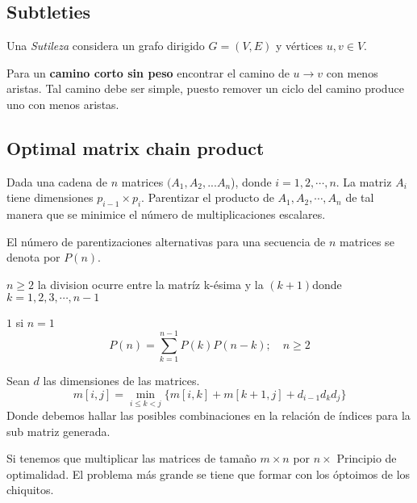 \documentclass[tikz,11pt,fleqn]{book} %
\begin{document}
\subsection{Subtleties}
Una \textit{Sutileza} considera un grafo dirigido $G=(V,E)$ y vértices $u,v\in V$.

Para un \textbf{camino corto sin peso} encontrar el camino de $u\to
 v$ con menos aristas. Tal camino debe ser simple, puesto remover un ciclo del camino produce uno con menos aristas.



\subsection{Optimal matrix chain product}
Dada una cadena de $n$ matrices $(A_1,A_2,...A_n$), donde $i=1,2,\cdots,n$. La matriz $A_i$ tiene dimensiones $p_{i-1}\times p_i$. Parentizar el producto de $A_1,A_2,\cdots,A_n$ de tal manera que se minimice el número de multiplicaciones escalares.
\begin{fact}
    El número de parentizaciones alternativas para una secuencia de $n$ matrices se denota por $P(n)$.
\end{fact}
\begin{fact}
    $n\ge 2$ la division ocurre entre la matríz k-ésima y la $(k+1) $donde $k=1,2,3,\cdots,n-1$
\end{fact}
\begin{fact}
    $1$ si $n=1$
    $$ P(n)= \sum_{k=1}^{n-1} P(k) P(n-k);\quad n\ge2
    $$
\end{fact}

\begin{theorem}
    Sean $d$ las dimensiones de las matrices.
    $$ m[i,j]=\min_{i\le k<j}\{m[i,k]+m[k+1,j]+d_{i-1}d_kd_j \} $$
    Donde debemos hallar las posibles combinaciones en la relación de índices para la sub matriz generada.
\end{theorem}

\begin{example}
    Si tenemos que multiplicar las matrices de tamaño $m\times n$ por $n\times$
    Principio de optimalidad. El problema más grande se tiene que formar con los óptoimos de los chiquitos.
\end{example}
\end{document}
